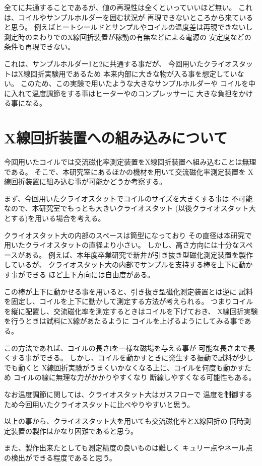 全てに共通することであるが、値の再現性は全くといっていいほど無い。
これは、コイルやサンプルホルダーを囲む状況が
再現できないところから来ていると思う。
例えばヒートシールドとサンプルやコイルの温度差は再現できないし
測定時のまわりでのX線回折装置が稼動の有無などによる電源の
安定度などの条件も再現できない。

これは、サンプルホルダー1と2に共通する事だが、
今回用いたクライオスタットはX線回折実験用であるため
本来内部に大きな物が入る事を想定していない。
このため、この実験で用いたような大きなサンプルホルダーや
コイルを中に入れて温度調節をする事はヒーターやのコンプレッサーに
大きな負担をかける事になる。


\section{X線回折装置への組み込みについて}\label{sec:改良}

今回用いたコイルでは交流磁化率測定装置をX線回折装置へ組み込むことは無理である。
そこで、本研究室にあるほかの機材を用いて交流磁化率測定装置を
X線回折装置に組み込む事が可能かどうか考察する。

まず、今回用いたクライオスタットでコイルのサイズを大きくする事は
不可能なので、本研究室でもっとも大きいクライオスタット
(以後クライオスタット大とする)を用いる場合を考える。

クライオスタット大の内部のスペースは筒型になっており
その直径は本研究で用いたクライオスタットの直径より小さい。
しかし、高さ方向には十分なスペースがある。
例えば、本年度卒業研究で新井が引き抜き型磁化測定装置を製作しているが、
クライオスタット大の内部でサンプルを支持する棒を上下に動かす事ができる
ほど上下方向には自由度がある。

この棒が上下に動かせる事を用いると、引き抜き型磁化測定装置とは逆に
試料を固定し、コイルを上下に動かして測定する方法が考えられる。
つまりコイルを縦に配置し、交流磁化率を測定するときはコイルを下げておき、
X線回折実験を行うときは試料にX線があたるように
コイルを上げるようにしてみる事である。

この方法であれば、コイルの長さlを一様な磁場を与える事が
可能な長さまで長くする事ができる。
しかし、コイルを動かすときに発生する振動で試料が少しでも動くと
X線回折実験がうまくいかなくなる上に、コイルを何度も動かすため
コイルの線に無理な力がかかりやすくなり
断線しやすくなる可能性もある。

なお温度調節に関しては、クライオスタット大はガスフローで
温度を制御するため今回用いたクライオスタットに比べやりやすいと思う。


以上の事から、クライオスタット大を用いても交流磁化率とX線回折の
同時測定装置の製作はかなり困難であると思う。

また、製作出来たとしても測定精度の良いものは難しく
キュリー点やネール点の検出ができる程度であると思う。

